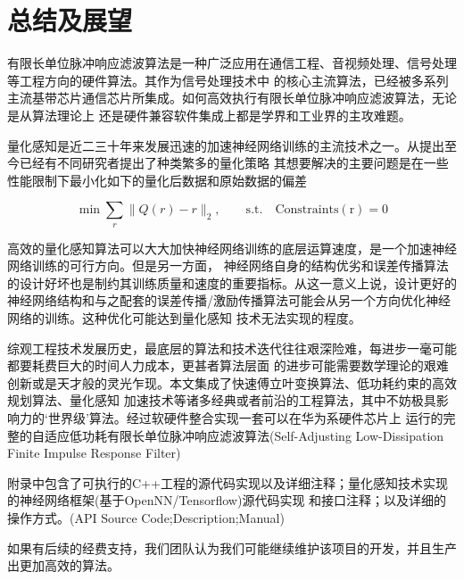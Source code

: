 \section{总结及展望}


有限长单位脉冲响应滤波算法是一种广泛应用在通信工程、音视频处理、信号处理等工程方向的硬件算法。其作为信号处理技术中
的核心主流算法，已经被多系列主流基带芯片通信芯片所集成。如何高效执行有限长单位脉冲响应滤波算法，无论是从算法理论上
还是硬件兼容软件集成上都是学界和工业界的主攻难题。

量化感知是近二三十年来发展迅速的加速神经网络训练的主流技术之一。从提出至今已经有不同研究者提出了种类繁多的量化策略
其想要解决的主要问题是在一些性能限制下最小化如下的量化后数据和原始数据的偏差

\begin{equation*}
    \min \sum_{r} \| Q(r) - r\|_2,\qquad \mathrm{s.t.}\quad \mathrm{Constraints(r) = 0}
\end{equation*}

高效的量化感知算法可以大大加快神经网络训练的底层运算速度，是一个加速神经网络训练的可行方向。但是另一方面，
神经网络自身的结构优劣和误差传播算法的设计好坏也是制约其训练质量和速度的重要指标。从这一意义上说，设计更好的
神经网络结构和与之配套的误差传播/激励传播算法可能会从另一个方向优化神经网络的训练。这种优化可能达到量化感知
技术无法实现的程度。

综观工程技术发展历史，最底层的算法和技术迭代往往艰深险难，每进步一毫可能都要耗费巨大的时间人力成本，更甚者算法层面
的进步可能需要数学理论的艰难创新或是天才般的灵光乍现。本文集成了快速傅立叶变换算法、低功耗约束的高效规划算法、量化感知
加速技术等诸多经典或者前沿的工程算法，其中不妨极具影响力的`世界级'算法。经过软硬件整合实现一套可以在华为系硬件芯片上
运行的完整的自适应低功耗有限长单位脉冲响应滤波算法(Self-Adjusting Low-Dissipation Finite Impulse Response Filter)

附录中包含了可执行的C++工程的源代码实现以及详细注释；量化感知技术实现的神经网络框架(基于OpenNN/Tensorflow)源代码实现
和接口注释；以及详细的操作方式。(API Source Code;Description;Manual)

如果有后续的经费支持，我们团队认为我们可能继续维护该项目的开发，并且生产出更加高效的算法。